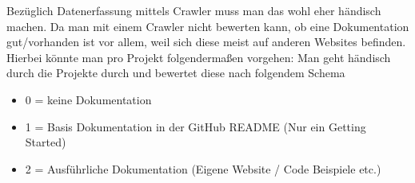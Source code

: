 Bezüglich Datenerfassung mittels Crawler muss man das wohl eher händisch machen. Da man mit einem
Crawler nicht bewerten kann, ob eine Dokumentation gut/vorhanden ist vor allem, weil sich diese
meist auf anderen Websites befinden. Hierbei könnte man pro Projekt folgendermaßen vorgehen:
Man geht händisch durch die Projekte durch und bewertet diese nach folgendem Schema

\begin{itemize}
    \item 0 = keine Dokumentation
    \item 1 = Basis Dokumentation in der GitHub README (Nur ein Getting Started)
    \item 2 = Ausführliche Dokumentation (Eigene Website / Code Beispiele etc.)
\end{itemize}
